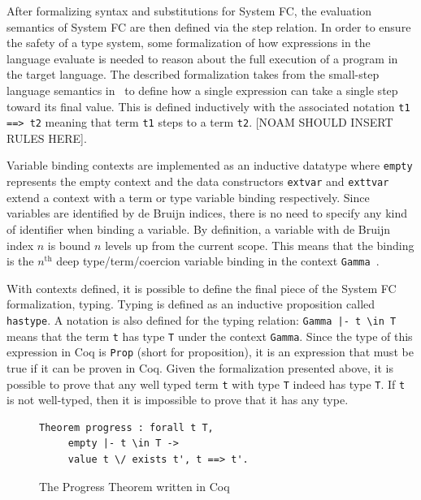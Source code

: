 \documentclass{sig-alternate}
\begin{document}
After formalizing syntax and substitutions for System FC, the evaluation semantics of System FC are then defined via the step relation. In order to ensure the safety of a type system, some formalization of how expressions in the language evaluate is needed to reason about the full execution of a program in the target language. The described formalization takes from the small-step language semantics in~\cite{Pierce:SF} to define how a single expression can take a single step toward its final value. This is defined inductively with the associated notation \texttt{t1 ==> t2} meaning that term \texttt{t1} steps to a term \texttt{t2}. [NOAM SHOULD INSERT RULES HERE].

Variable binding contexts are implemented as an inductive datatype where \texttt{empty} represents the empty context and the data constructors \texttt{ext\textunderscore var} and \texttt{ext\textunderscore tvar} extend a context with a term or type variable binding respectively. Since variables are identified by de Bruijn indices, there is no need to specify any kind of identifier when binding a variable. By definition, a variable with de Bruijn index $n$ is bound $n$ levels up from the current scope. This means that the binding is the $n^\text{th}$ deep type/term/coercion variable binding in the context \texttt{Gamma}~\cite{Vouillon12}.

With contexts defined, it is possible to define the final piece of the System FC formalization, typing. Typing is defined as an inductive proposition called \texttt{has\textunderscore type}. A notation is also defined for the typing relation: \texttt{Gamma |- t \textbackslash in T} means that the term \texttt{t} has type \texttt{T} under the context \texttt{Gamma}. Since the type of this expression in Coq is \texttt{Prop} (short for proposition), it is an expression that must be true if it can be proven in Coq. Given the formalization presented above, it is possible to prove that any well typed term \texttt{t} with type \texttt{T} indeed has type \texttt{T}. If \texttt{t} is not well-typed, then it is impossible to prove that it has any type.

\begin{figure}[h!]
\begin{lstlisting}
Theorem progress : forall t T, 
     empty |- t \in T ->
     value t \/ exists t', t ==> t'.
\end{lstlisting}
\caption{The Progress Theorem written in Coq}
\label{fig:progress-coq}
\end{figure}
\end{document}
